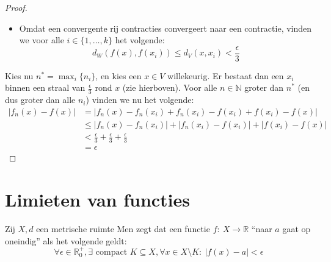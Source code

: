 \documentclass[main.tex]{subfiles}
\begin{document}
\begin{st}
\begin{proof}
\begin{itemize}
    \item Omdat een convergente rij contracties convergeert naar een contractie, vinden we voor alle $i\in\{1,\dotsc,k\}$ het volgende:
      \[ d_{W}(f(x),f(x_{i})) \le d_{V}(x,x_{i}) < \frac{\epsilon}{3} \]
    \end{itemize}
    Kies nu $n^{*} = \max_{i}\{ n_{i}\}$, en kies een $x\in V$ willekeurig.
    Er bestaat dan een $x_{i}$ binnen een straal van $\frac{\epsilon}{3}$ rond $x$ (zie hierboven).
    Voor alle $n\in \mathbb{N}$ groter dan $n^{*}$ (en dus groter dan alle $n_{i}$) vinden we nu het volgende:
    \begin{align*}
      |f_{n}(x) - f(x)|
      &= |f_{n}(x) - f_{n}(x_{i}) + f_{n}(x_{i}) - f(x_{i}) + f(x_{i}) - f(x)|\\
      &\le |f_{n}(x) - f_{n}(x_{i})| + |f_{n}(x_{i}) - f(x_{i})| + |f(x_{i}) - f(x)|\\
      &< \frac{\epsilon}{3} + \frac{\epsilon}{3} +\frac{\epsilon}{3}\\
      &= \epsilon
    \end{align*}
  \end{proof}
\end{st}

\section{Limieten van functies}
\label{sec:limi-van-funct}

\begin{de}
  Zij $X,d$ een metrische ruimte
  Men zegt dat een functie $f:\ X \rightarrow \mathbb{R}$ ``naar $a$ gaat op oneindig'' als het volgende geldt:
  \[ \forall \epsilon \in \mathbb{R}_{0}^{+}, \exists \text{ compact } K \subseteq X, \forall x\in X \setminus K:\ |f(x)-a|< \epsilon \]
\end{de}
\end{document}
